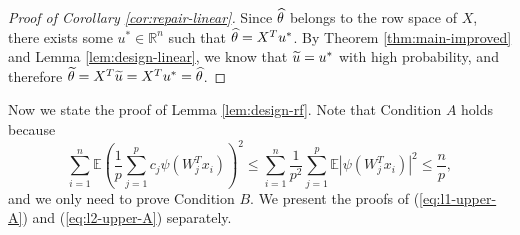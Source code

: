 \begin{proof}[Proof of Corollary \ref{cor:repair-linear}]
Since $\widehat{\theta}$ belongs to the row space of $X$, there exists some $u^*\in\mathbb{R}^n$ such that $\widehat{\theta}=X^Tu^*$.
By Theorem \ref{thm:main-improved} and Lemma \ref{lem:design-linear}, we know that $\widetilde{u}=u^*$ with high probability, and therefore $\widetilde{\theta}=X^T\widetilde{u}=X^Tu^*=\widehat{\theta}$.
\end{proof}


Now we state the proof of Lemma \ref{lem:design-rf}. Note that Condition $A$ holds because
$$\sum_{i=1}^n\mathbb{E}\left(\frac{1}{p}\sum_{j=1}^pc_j\psi(W_j^Tx_i)\right)^2  \leq \sum_{i=1}^n\frac{1}{p^2}\sum_{j=1}^p\mathbb{E}|\psi(W_j^Tx_i)|^2\leq \frac{n}{p},$$
and we only need to prove Condition $B$. We present the proofs of (\ref{eq:l1-upper-A}) and (\ref{eq:l2-upper-A}) separately.
